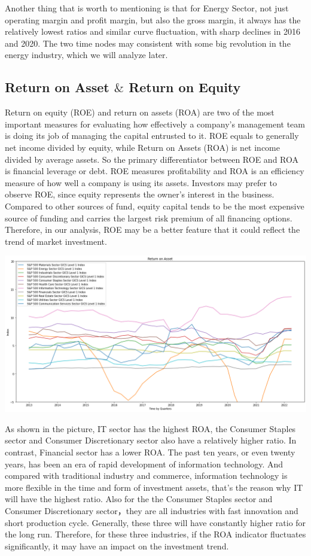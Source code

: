 \documentclass{article}
\begin{document}
Another thing that is worth to mentioning is that for Energy Sector, not just operating margin and profit margin, but also the gross margin, it always has the relatively lowest ratios and similar curve fluctuation, with sharp declines in 2016 and 2020. The two time nodes may consistent with some big revolution in the energy industry, which we will analyze later.


\subsection{Return on Asset $\&$ Return on Equity}
Return on equity (ROE) and return on assets (ROA) are two of the most important measures for evaluating how effectively a company’s management team is doing its job of managing the capital entrusted to it. ROE equals to generally net income divided by equity, while Return on Assets (ROA) is net income divided by average assets. So the primary differentiator between ROE and ROA is financial leverage or debt. ROE measures profitability and ROA is an efficiency measure of how well a company is using its assets.
Investors may prefer to observe ROE, since equity represents the owner's interest in the business. Compared to other sources of fund, equity capital tends to be the most expensive source of funding and carries the largest risk premium of all financing options. Therefore, in our analysis, ROE may be a better feature that it could reflect the trend of market investment.
\begin{center}
    \includegraphics[scale=0.4]{roa.png}
\end{center}
As shown in the picture, IT sector has the highest ROA, the Consumer Staples sector and Consumer Discretionary sector also have a relatively higher ratio. In contrast, Financial sector has a lower ROA. 
The past ten years, or even twenty years, has been an era of rapid development of information technology. And compared with traditional industry and commerce, information technology is more flexible in the time and form of investment assets, that's the reason why IT will have the highest ratio. Also for the the Consumer Staples sector and Consumer Discretionary sector，they are all industries with fast innovation and short production cycle. Generally, these three will have constantly higher ratio for the long run. Therefore, for these three industries, if the ROA indicator fluctuates significantly, it may have an impact on the investment trend.
\end{document}
